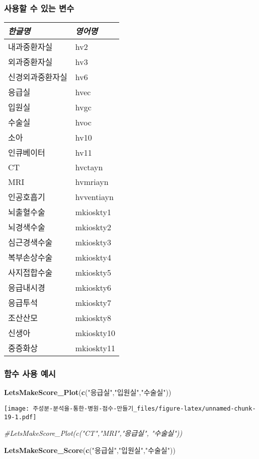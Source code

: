 \documentclass[
]{article}
\newenvironment{Shaded}{\begin{snugshade}}{\end{snugshade}}
\newcommand{\CommentTok}[1]{\textcolor[rgb]{0.56,0.35,0.01}{\textit{#1}}}
\newcommand{\KeywordTok}[1]{\textcolor[rgb]{0.13,0.29,0.53}{\textbf{#1}}}
\newcommand{\NormalTok}[1]{#1}
\newcommand{\StringTok}[1]{\textcolor[rgb]{0.31,0.60,0.02}{#1}}
\begin{document}
\hypertarget{uxc0acuxc6a9uxd560-uxc218-uxc788uxb294-uxbcc0uxc218}{%
\subsubsection{사용할 수 있는
변수}\label{uxc0acuxc6a9uxd560-uxc218-uxc788uxb294-uxbcc0uxc218}}

\begin{longtable}[]{@{}ll@{}}
\toprule
\emph{한글명} & \emph{영어명}\tabularnewline
\midrule
\endhead
내과중환자실 & hv2\tabularnewline
외과중환자실 & hv3\tabularnewline
신경외과중환자실 & hv6\tabularnewline
응급실 & hvec\tabularnewline
입원실 & hvgc\tabularnewline
수술실 & hvoc\tabularnewline
소아 & hv10\tabularnewline
인큐베이터 & hv11\tabularnewline
CT & hvctayn\tabularnewline
MRI & hvmriayn\tabularnewline
인공호흡기 & hvventiayn\tabularnewline
뇌출혈수술 & mkioskty1\tabularnewline
뇌경색수술 & mkioskty2\tabularnewline
심근경색수술 & mkioskty3\tabularnewline
복부손상수술 & mkioskty4\tabularnewline
사지접합수술 & mkioskty5\tabularnewline
응급내시경 & mkioskty6\tabularnewline
응급투석 & mkioskty7\tabularnewline
조산산모 & mkioskty8\tabularnewline
신생아 & mkioskty10\tabularnewline
중증화상 & mkioskty11\tabularnewline
\bottomrule
\end{longtable}

\hypertarget{uxd568uxc218-uxc0acuxc6a9-uxc608uxc2dc}{%
\subsubsection{함수 사용
예시}\label{uxd568uxc218-uxc0acuxc6a9-uxc608uxc2dc}}

\begin{Shaded}
\begin{Highlighting}[]
\KeywordTok{LetsMakeScore_Plot}\NormalTok{(}\KeywordTok{c}\NormalTok{(}\StringTok{"응급실"}\NormalTok{,}\StringTok{"입원실"}\NormalTok{,}\StringTok{"수술실"}\NormalTok{))}
\end{Highlighting}
\end{Shaded}

\texttt{[image: 주성분-분석을-통한-병원-점수-만들기\_files/figure-latex/unnamed-chunk-19-1.pdf]}

\begin{Shaded}
\begin{Highlighting}[]
\CommentTok{#LetsMakeScore_Plot(c("CT","MRI","응급실", "수술실"))}
\end{Highlighting}
\end{Shaded}

\begin{Shaded}
\begin{Highlighting}[]
\KeywordTok{LetsMakeScore_Score}\NormalTok{(}\KeywordTok{c}\NormalTok{(}\StringTok{"응급실"}\NormalTok{,}\StringTok{"입원실"}\NormalTok{,}\StringTok{"수술실"}\NormalTok{))}
\end{Highlighting}
\end{Shaded}
\end{document}
